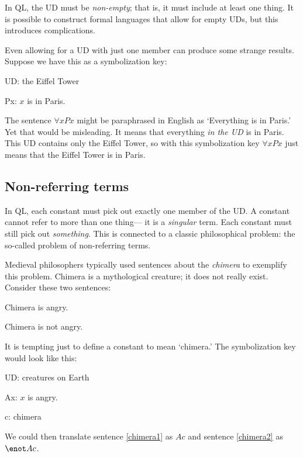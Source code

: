 

In QL, the UD must be \emph{non-empty}; that is, it must include at least one thing. It is possible to construct formal languages that allow for empty UDs, but this introduces complications.

Even allowing for a UD with just one member can produce some strange results. Suppose we have this as a symbolization key:
\begin{ekey}
\item[UD:] the Eiffel Tower
\item[Px:] $x$ is in Paris.
\end{ekey}
The sentence $\forall x Px$ might be paraphrased in English as `Everything is in Paris.' Yet that would be misleading. It means that everything \emph{in the UD} is in Paris. This UD contains only the Eiffel Tower, so with this symbolization key $\forall x Px$ just means that the Eiffel Tower is in Paris.



\subsection{Non-referring terms}
In QL, each constant must pick out exactly one member of the UD. A constant cannot refer to more than one thing--- it is a \emph{singular} term. Each constant must still pick out \emph{something}. This is connected to a classic philosophical problem: the so-called problem of non-referring terms.

Medieval philosophers typically used sentences about the \emph{chimera} to exemplify this problem. Chimera is a mythological creature; it does not really exist. Consider these two sentences:
\begin{earg}
\item[\ex{chimera1}] Chimera is angry.
\item[\ex{chimera2}] Chimera is not angry.
\end{earg}
It is tempting just to define a constant to mean `chimera.' The symbolization key would look like this:
\begin{ekey}
\item[UD:] creatures on Earth
\item[Ax:] $x$ is angry.
\item[c:] chimera
\end{ekey}
We could then translate sentence \ref{chimera1} as $Ac$ and sentence \ref{chimera2} as $\enot Ac$.

